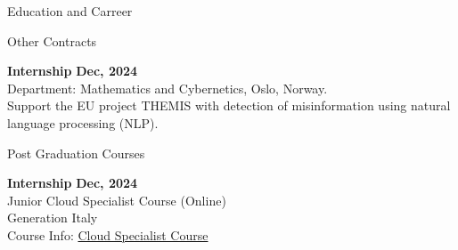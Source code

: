 \documentclass{resume} %
\begin{document}
\begin{rSection}{Education and Carreer}


%
%


        \begin{rSubsection2}{Other Contracts}

            \item\textbf{ Internship }\hfill \textbf{Dec, 2024}
            \\Department: Mathematics and Cybernetics, Oslo, Norway.
            \\Support the EU project THEMIS with detection of misinformation using natural language processing (NLP).

        \end{rSubsection2}

        \begin{rSubsection}{Post Graduation Courses}

            \item\textbf{ Internship }\hfill \textbf{Dec, 2024}
            \\ Junior Cloud Specialist Course (Online)
            \\ Generation Italy
            \\ Course Info: \href{https://italy.generation.org/programs/cloud-specialist/}{Cloud Specialist Course}

        \end{rSubsection}

    \end{rSection}
\end{document}
